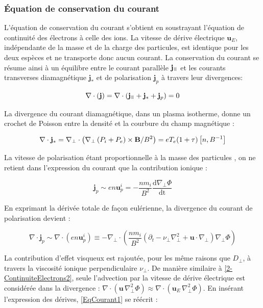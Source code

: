 \begin{refsection}
\subsubsection{Équation de conservation du courant}
L'équation de conservation du courant s'obtient en soustrayant l'équation de
continuité des électrons à celle des ions. La vitesse de dérive électrique
$\mathbf{u}_E$, indépendante de la masse et de la charge des particules,
est identique pour les deux espèces et ne transporte donc aucun courant. 
La conservation du courant se résume ainsi à un équilibre entre le courant
parallèle $\mathbf{j}_\para$ et les courants transverses diamagnétique
$\mathbf{j}_*$ et de polarisation $\mathbf{j}_p$ à travers leur
divergences:

\begin{equation}
\label{EqCourant1}
\nabla\cdot\left(\mathbf{j}\right) = 
\nabla\cdot\left(\mathbf{j}_\para+\mathbf{j}_*+\mathbf{j}_p\right)
= 0
\end{equation}

La divergence du courant diamagnétique, dans un plasma isotherme, donne un
crochet de Poisson entre la densité et la courbure du champ magnétique :

\begin{equation}
\nabla\cdot\mathbf{j}_*=
\nabla_\perp\cdot\left(\nabla_\perp\left(
P_i+P_e\right)\times\mathbf{B}/B^2\right) =
eT_e(1+\tau)\left[n,B^{{-1}}\right]
\end{equation}

La vitesse de polarisation étant
proportionnelle à la masse des particules , on ne
retient dans l'expression du courant que la contribution ionique :

\begin{equation}
\mathbf{j}_p\sim
en\mathbf{u}^i_p=-\frac{nm_{i}}{B^2}\frac{\text{d}\nabla_\perp \Phi}{\text{dt}}
\end{equation}

En exprimant la dérivée totale de
façon eulérienne, la divergence du courant de polarisation devient :

\begin{equation}
\nabla\cdot\mathbf{j}_p\sim\nabla\cdot\left({e}n\mathbf{u}^i_p\right)\equiv
-\nabla_\perp\cdot\left(\frac{nm_{i}}{B^2}\left(\partial_{t} -
\nu_\perp \nabla_\perp^2 +
\mathbf{u}\cdot\nabla_\perp\right)\nabla_\perp \Phi\right)
\end{equation}

La contribution d'effet visqueux est rajoutée, pour les même raisons que
$D_\perp$, à travers la viscosité ionique perpendiculaire $\nu_\perp$.
De manière similaire à \eqref{2-ContinuiteElectrons2}, seule l'advection par la
vitesse de dérive électrique est considérée dans la divergence : 
$\nabla\cdot\left(\mathbf{u}\,\nabla_\perp^2 \Phi\right)
\approx\nabla\cdot\left(\mathbf{u}_E\,\nabla_\perp^2 \Phi\right)$.
En insérant l'expression des dérives, \eqref{EqCourant1} se réécrit :


\end{refsection}
